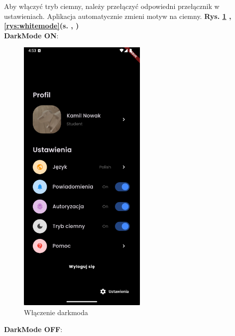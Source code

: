 Aby włączyć tryb ciemny, należy przełączyć odpowiedni przełącznik w ustawieniach. Aplikacja automatycznie zmieni motyw na ciemny. \textbf{Rys. \ref{rys:darkmode} ,\ref{rys:whitemode}(s. \pageref{rys:darkmode} , \pageref{rys:whitemode})}
\\\textbf{DarkMode ON}:
\begin{figure}[h!]
	\centering
	\includegraphics[width=0.55\textwidth]{rys/darkmode.png}
	\caption{Włączenie darkmoda}
	\label{rys:darkmode}
\end{figure}
\newpage
\textbf{DarkMode OFF}:
